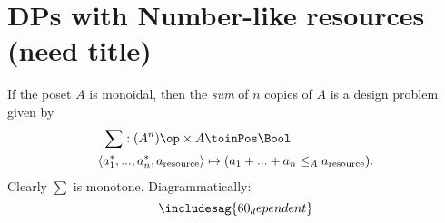 \section{DPs with Number-like resources (need title) }



\begin{definition}
If the poset $A$ is monoidal, then the \emph{sum} of $n$ copies of $A$ is a design problem given by
\begin{align*}
\sum : (A^n)\op \times A &\toinPos \Bool \\
\langle a_1^*, ..., a_n^*, a_\text{resource} \rangle &\mapsto (a_1 + ... + a_n \leq_A a_\text{resource}).
\end{align*}
Clearly $\sum$ is monotone. Diagrammatically:
\[
\includesag{60_dependent}
\]
\end{definition}

